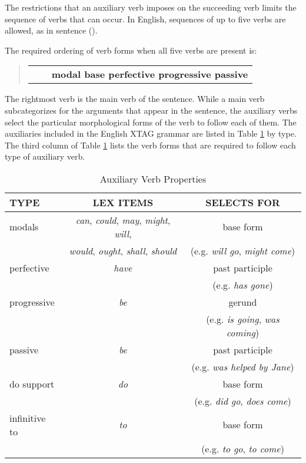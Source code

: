 \noindent The restrictions that an auxiliary verb imposes on the succeeding verb limits
the sequence of verbs that can occur.  In English, sequences of up to five
verbs are allowed, as in sentence ().


\noindent 
The required ordering of verb forms when all five verbs are present is:

\begin{quote}
\begin{tabular}{ccl}
& & {\bf modal base perfective progressive passive}
\end{tabular}
\end{quote}

\noindent
The rightmost verb is the main verb of the sentence.  While a main verb
subcategorizes for the arguments that appear in the sentence, the auxiliary
verbs select the particular morphological forms of the verb to follow each of
them.  The auxiliaries included in the English XTAG grammar are listed in Table
\ref{aux-table} by type.  The third column of Table \ref{aux-table} lists the
verb forms that are required to follow each type of auxiliary verb.

\vspace*{0.2in}

\begin{table}[ht]
\centering
\begin{tabular}{|l|c|c|}  
\hline
TYPE&LEX ITEMS&SELECTS FOR\\     
\hline
modals & {\it can}, {\it could}, {\it may}, {\it might}, {\it will}, & base form\footnotemark
\\ & {\it would}, {\it ought}, {\it shall}, {\it should} & (e.g. {\it will
go}, {\it might come})\\
\hline
perfective & {\it have} & past participle\\
& & (e.g. {\it has gone})\\  
\hline
progressive & {\it be} & gerund\\
& & (e.g. {\it is going}, {\it was coming})\\  
\hline
passive & {\it be} & past participle\\
& & (e.g. {\it was helped by Jane})\\  
\hline
do support & {\it do} &base form\\
& & (e.g. {\it did go}, {\it does come})\\  
\hline
infinitive to & {\it to} & base form\\
& & (e.g. {\it to go}, {\it to come})\\  
\hline
\end{tabular}
\caption{Auxiliary Verb Properties}
\label{aux-table}
\end{table}

